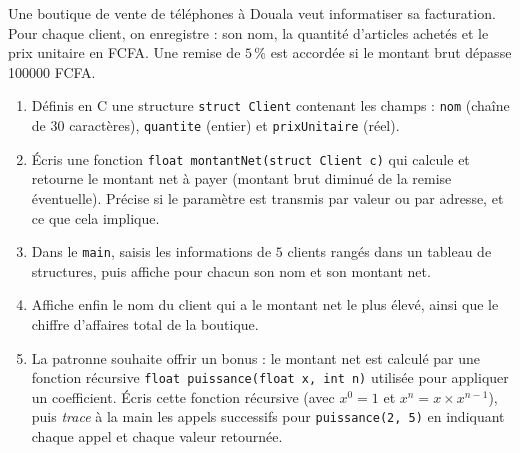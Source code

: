 \documentclass[11pt]{article}
\begin{document}
\begin{exercice}
Une boutique de vente de téléphones à Douala veut informatiser sa facturation. Pour chaque client, on enregistre : son nom, la quantité d'articles achetés et le prix unitaire en FCFA. Une remise de $5\,\%$ est accordée si le montant brut dépasse \num{100000} FCFA.
\begin{enumerate}
\item Définis en C une structure \texttt{struct Client} contenant les champs : \texttt{nom} (chaîne de $30$ caractères), \texttt{quantite} (entier) et \texttt{prixUnitaire} (réel).
\item Écris une fonction \texttt{float montantNet(struct Client c)} qui calcule et retourne le montant net à payer (montant brut diminué de la remise éventuelle). Précise si le paramètre est transmis par valeur ou par adresse, et ce que cela implique.
\item Dans le \texttt{main}, saisis les informations de $5$ clients rangés dans un tableau de structures, puis affiche pour chacun son nom et son montant net.
\item Affiche enfin le nom du client qui a le montant net le plus élevé, ainsi que le chiffre d'affaires total de la boutique.
\item La patronne souhaite offrir un bonus : le montant net est calculé par une fonction récursive \texttt{float puissance(float x, int n)} utilisée pour appliquer un coefficient. Écris cette fonction récursive (avec $x^0 = 1$ et $x^n = x \times x^{n-1}$), puis \emph{trace} à la main les appels successifs pour \texttt{puissance(2, 5)} en indiquant chaque appel et chaque valeur retournée.
\end{enumerate}
\end{exercice}
\end{document}
